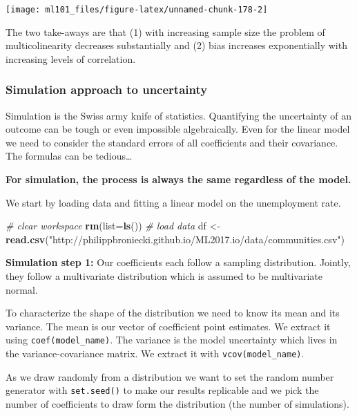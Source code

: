 \documentclass[]{article}
\newenvironment{Shaded}{\begin{snugshade}}{\end{snugshade}}
\newcommand{\CommentTok}[1]{\textcolor[rgb]{0.56,0.35,0.01}{\textit{#1}}}
\newcommand{\DataTypeTok}[1]{\textcolor[rgb]{0.13,0.29,0.53}{#1}}
\newcommand{\KeywordTok}[1]{\textcolor[rgb]{0.13,0.29,0.53}{\textbf{#1}}}
\newcommand{\NormalTok}[1]{#1}
\newcommand{\StringTok}[1]{\textcolor[rgb]{0.31,0.60,0.02}{#1}}
\begin{document}
\begin{center}\texttt{[image: ml101\_files/figure-latex/unnamed-chunk-178-2]} \end{center}

The two take-aways are that (1) with increasing sample size the problem of multicolinearity decreases substantially and (2) bias increases exponentially with increasing levels of correlation.

\hypertarget{simulation-approach-to-uncertainty}{%
\subsubsection{Simulation approach to uncertainty}\label{simulation-approach-to-uncertainty}}

Simulation is the Swiss army knife of statistics. Quantifying the uncertainty of an outcome can be tough or even impossible algebraically. Even for the linear model we need to consider the standard errors of all coefficients and their covariance. The formulas can be tedious\ldots{}

\textbf{For simulation, the process is always the same regardless of the model.}

We start by loading data and fitting a linear model on the unemployment rate.

\begin{Shaded}
\begin{Highlighting}[]
\CommentTok{# clear workspace}
\KeywordTok{rm}\NormalTok{(}\DataTypeTok{list=}\KeywordTok{ls}\NormalTok{())}
\CommentTok{# load data}
\NormalTok{df <-}\StringTok{ }\KeywordTok{read.csv}\NormalTok{(}\StringTok{"http://philippbroniecki.github.io/ML2017.io/data/communities.csv"}\NormalTok{)}
\end{Highlighting}
\end{Shaded}

\textbf{Simulation step 1:} Our coefficients each follow a sampling distribution. Jointly, they follow a multivariate distribution which is assumed to be multivariate normal.

To characterize the shape of the distribution we need to know its mean and its variance. The mean is our vector of coefficient point estimates. We extract it using \texttt{coef(model\_name)}. The variance is the model uncertainty which lives in the variance-covariance matrix. We extract it with \texttt{vcov(model\_name)}.

As we draw randomly from a distribution we want to set the random number generator with \texttt{set.seed()} to make our results replicable and we pick the number of coefficients to draw form the distribution (the number of simulations).
\end{document}
